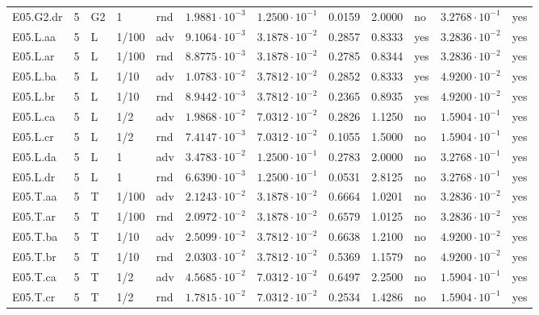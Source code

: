 {\begin{longtable}{@{}lllllllllll l@{}}
E05.G2.dr & 5 & G2 & 1 & rnd & $1.9881\cdot 10^{-3}$ & $1.2500\cdot 10^{-1}$ & 0.0159 & 2.0000 & no & $3.2768\cdot 10^{-1}$ & yes \\
E05.L.aa & 5 & L & 1/100 & adv & $9.1064\cdot 10^{-3}$ & $3.1878\cdot 10^{-2}$ & 0.2857 & 0.8333 & yes & $3.2836\cdot 10^{-2}$ & yes \\
E05.L.ar & 5 & L & 1/100 & rnd & $8.8775\cdot 10^{-3}$ & $3.1878\cdot 10^{-2}$ & 0.2785 & 0.8344 & yes & $3.2836\cdot 10^{-2}$ & yes \\
E05.L.ba & 5 & L & 1/10 & adv & $1.0783\cdot 10^{-2}$ & $3.7812\cdot 10^{-2}$ & 0.2852 & 0.8333 & yes & $4.9200\cdot 10^{-2}$ & yes \\
E05.L.br & 5 & L & 1/10 & rnd & $8.9442\cdot 10^{-3}$ & $3.7812\cdot 10^{-2}$ & 0.2365 & 0.8935 & yes & $4.9200\cdot 10^{-2}$ & yes \\
E05.L.ca & 5 & L & 1/2 & adv & $1.9868\cdot 10^{-2}$ & $7.0312\cdot 10^{-2}$ & 0.2826 & 1.1250 & no & $1.5904\cdot 10^{-1}$ & yes \\
E05.L.cr & 5 & L & 1/2 & rnd & $7.4147\cdot 10^{-3}$ & $7.0312\cdot 10^{-2}$ & 0.1055 & 1.5000 & no & $1.5904\cdot 10^{-1}$ & yes \\
E05.L.da & 5 & L & 1 & adv & $3.4783\cdot 10^{-2}$ & $1.2500\cdot 10^{-1}$ & 0.2783 & 2.0000 & no & $3.2768\cdot 10^{-1}$ & yes \\
E05.L.dr & 5 & L & 1 & rnd & $6.6390\cdot 10^{-3}$ & $1.2500\cdot 10^{-1}$ & 0.0531 & 2.8125 & no & $3.2768\cdot 10^{-1}$ & yes \\
E05.T.aa & 5 & T & 1/100 & adv & $2.1243\cdot 10^{-2}$ & $3.1878\cdot 10^{-2}$ & 0.6664 & 1.0201 & no & $3.2836\cdot 10^{-2}$ & yes \\
E05.T.ar & 5 & T & 1/100 & rnd & $2.0972\cdot 10^{-2}$ & $3.1878\cdot 10^{-2}$ & 0.6579 & 1.0125 & no & $3.2836\cdot 10^{-2}$ & yes \\
E05.T.ba & 5 & T & 1/10 & adv & $2.5099\cdot 10^{-2}$ & $3.7812\cdot 10^{-2}$ & 0.6638 & 1.2100 & no & $4.9200\cdot 10^{-2}$ & yes \\
E05.T.br & 5 & T & 1/10 & rnd & $2.0303\cdot 10^{-2}$ & $3.7812\cdot 10^{-2}$ & 0.5369 & 1.1579 & no & $4.9200\cdot 10^{-2}$ & yes \\
E05.T.ca & 5 & T & 1/2 & adv & $4.5685\cdot 10^{-2}$ & $7.0312\cdot 10^{-2}$ & 0.6497 & 2.2500 & no & $1.5904\cdot 10^{-1}$ & yes \\
E05.T.cr & 5 & T & 1/2 & rnd & $1.7815\cdot 10^{-2}$ & $7.0312\cdot 10^{-2}$ & 0.2534 & 1.4286 & no & $1.5904\cdot 10^{-1}$ & yes \\

\end{longtable}}
